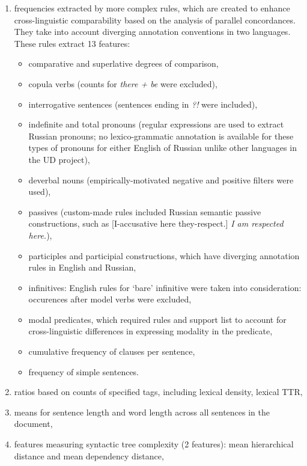 \begin{enumerate}
	\item frequencies extracted by more complex rules, which are created to enhance cross-linguistic comparability based on the analysis of parallel concordances. They take into account diverging annotation conventions in two languages. These rules extract 13 features: 
	\begin{itemize}\compresslist{}
		\item comparative and superlative degrees of comparison,
		\item copula verbs (counts for \textit{there + be} were excluded), 
		\item interrogative sentences (sentences ending in \textit{?!} were included),
		\item indefinite and total pronouns (regular expressions are used to extract Russian pronouns; no lexico-grammatic annotation is available for these types of pronouns for either English of Russian unlike other languages in the UD project), 
		\item deverbal nouns (empirically-motivated negative and positive filters were used),
		\item passives (custom-made rules included Russian semantic passive constructions, such as  [I-accusative here they-respect.] \textit{I am respected here.}), %
		\item participles and participial constructions, which have diverging annotation rules in English and Russian, 
		\item infinitives: English rules for `bare' infinitive were taken into consideration: occurences after model verbs were excluded,
		\item modal predicates, which required rules and support list to account for cross-linguistic differences in expressing modality in the predicate,
		\item cumulative frequency of clauses per sentence,
		\item frequency of simple sentences.
	\end{itemize}

	\item ratios based on counts of specified tags, including lexical density, lexical TTR,
	
	\item means for sentence length and word length across all sentences in the document, 
	
	\item features measuring syntactic tree complexity (2 features): mean hierarchical distance and mean dependency distance,
	

\end{enumerate}
